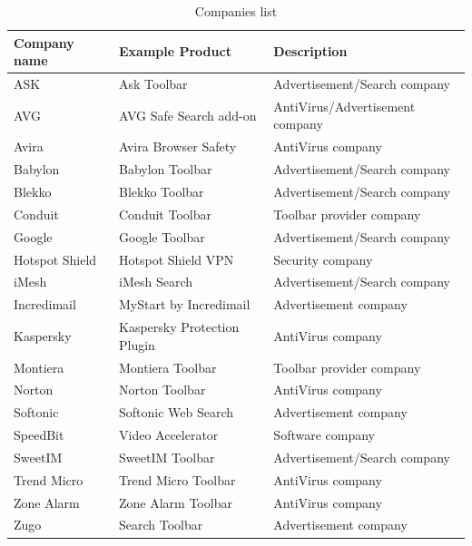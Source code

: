 \documentclass[11pt,oneside]{book}
\begin{document}
\begin{table}[h]
\centering
\caption{Companies list}
\label{table:companies_list}
\begin{tabular}{@{}lll@{}}
\toprule
{\bf Company name} & {\bf Example Product}               & {\bf Description}               \\ \midrule
ASK                & Ask Toolbar                 & Advertisement/Search company    \\
AVG                & AVG Safe Search add-on      & AntiVirus/Advertisement company \\
Avira              & Avira Browser Safety        & AntiVirus company               \\
Babylon            & Babylon Toolbar             & Advertisement/Search company    \\
Blekko             & Blekko Toolbar              & Advertisement/Search company    \\
Conduit            & Conduit Toolbar             & Toolbar provider company        \\
Google             & Google Toolbar              & Advertisement/Search company    \\
Hotspot Shield     & Hotspot Shield VPN          & Security company                \\
iMesh              & iMesh Search                & Advertisement/Search company    \\
Incredimail        & MyStart by Incredimail      & Advertisement company           \\
Kaspersky          & Kaspersky Protection Plugin & AntiVirus company               \\
Montiera           & Montiera Toolbar            & Toolbar provider company        \\
Norton             & Norton Toolbar              & AntiVirus company               \\
Softonic           & Softonic Web Search         & Advertisement company           \\
SpeedBit           & Video Accelerator           & Software company                \\
SweetIM            & SweetIM Toolbar             & Advertisement/Search company    \\
Trend Micro        & Trend Micro Toolbar         & AntiVirus company               \\
Zone Alarm         & Zone Alarm Toolbar          & AntiVirus company               \\ 
Zugo               & Search Toolbar              & Advertisement company           \\ \bottomrule
\end{tabular}
\end{table}
\end{document}
